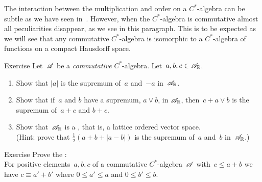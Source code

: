 \documentclass[main]{subfiles}
\begin{document}
\begin{parsec}%
\begin{point}%
The interaction between the multiplication and order
on a $C^*$-algebra can be subtle
as we have seen in~\TODO{}.  However,
when the $C^*$-algebra is commutative
almost all peculiarities disappear,
as we see in this paragraph.
This is to be expected
as we will see that any commutative $C^*$-algebra
is isomorphic to a $C^*$-algebra
of functions on a compact Hausdorff space.
\end{point}
\begin{point}{Exercise}%
Let~$\mathscr{A}$ be a \emph{commutative} $C^*$-algebra.
Let~$a,b,c\in\mathscr{A}_{\mathbb{R}}$.
\begin{enumerate}
\item
Show that $\left| a\right|$ is the supremum of~$a$ and~$-a$
in~$\mathscr{A}_{\mathbb{R}}$.
\item
Show that if~$a$ and $b$ have a supremum, $a\vee b$, in $\mathscr{A}_{\mathbb{R}}$,
then~$c+a\vee b$ is the supremum of~$a+c$ and $b+c$.
\item
Show that~$\mathscr{A}_{\mathbb{R}}$ is a ,
that is,  a lattice ordered vector space.\\
(Hint: prove that $\frac{1}{2}(a+b+\left|a-b\right|)$
is the supremum of~$a$ and~$b$ in~$\mathscr{A}_{\mathbb{R}}$.)
\end{enumerate}
\end{point}
\begin{point}{Exercise}%
Prove the :\\
For positive elements~$a,b,c$ of a commutative $C^*$-algebra~$\mathscr{A}$
with~$c\leq a+b$
we have $c\equiv a'+b'$
where  $0\leq a'\leq a$ and $0\leq b'\leq b$.
\end{point}
\end{parsec}
\end{document}
